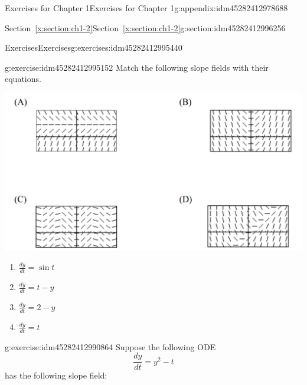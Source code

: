 \documentclass[oneside,10pt,]{book}
\numberwithin{equation}{section}
\numberwithin{equation}{section}
\begin{document}
\begin{appendixptx}{Exercises for Chapter 1}{}{Exercises for Chapter 1}{}{}{g:appendix:idm45282412978688}
\begin{sectionptx}{Section~\ref*{x:section:ch1-2}}{}{Section~\ref*{x:section:ch1-2}}{}{}{g:section:idm45282412996256}
\typeout{************************************************}
%
\begin{exercises-subsection-numberless}{Exercises}{}{Exercises}{}{}{g:exercises:idm45282412995440}
\begin{divisionexercise}{1}{}{}{g:exercise:idm45282412995152}%
Match the following slope fields with their equations. \begin{image}{0}{1}{0}%
\includegraphics[width=\linewidth]{images/1.2-1.png}
\end{image}%
%
\begin{enumerate}[label=(\alph*)]
\item{}\(\frac{dy}{dt}=\sin t\)%
\item{}\(\frac{dy}{dt}=t-y\)%
\item{}\(\frac{dy}{dt}=2-y\)%
\item{}\(\frac{dy}{dt}=t\)%
\end{enumerate}
\end{divisionexercise}%
\begin{divisionexercise}{2}{}{}{g:exercise:idm45282412990864}%
Suppose the following ODE%
\begin{equation*}
\frac{dy}{dt}=y^{2}-t
\end{equation*}
has the following slope field: \begin{image}{0}{1}{0}%

\end{image}
\end{divisionexercise}
\end{exercises-subsection-numberless}
\end{sectionptx}
\end{appendixptx}
\end{document}
